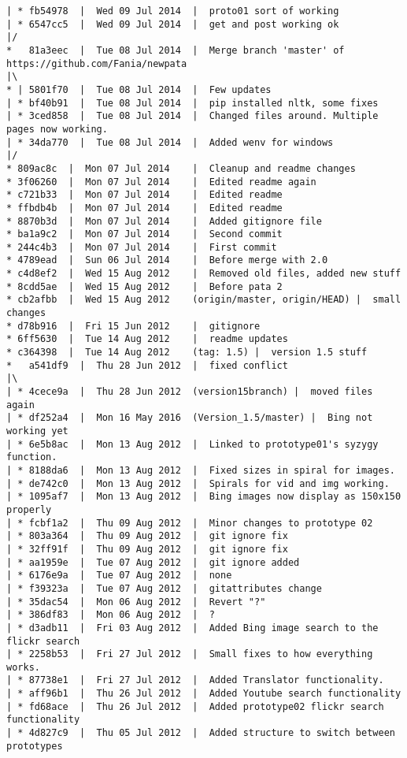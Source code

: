 \begin{verbatim}
| * fb54978  |  Wed 09 Jul 2014	 |  proto01 sort of working
| * 6547cc5  |  Wed 09 Jul 2014	 |  get and post working ok
|/  
*   81a3eec  |  Tue 08 Jul 2014	 |  Merge branch 'master' of https://github.com/Fania/newpata
|\  
* | 5801f70  |  Tue 08 Jul 2014	 |  Few updates
| * bf40b91  |  Tue 08 Jul 2014	 |  pip installed nltk, some fixes
| * 3ced858  |  Tue 08 Jul 2014	 |  Changed files around. Multiple pages now working.
| * 34da770  |  Tue 08 Jul 2014	 |  Added wenv for windows
|/  
* 809ac8c  |  Mon 07 Jul 2014	 |  Cleanup and readme changes
* 3f06260  |  Mon 07 Jul 2014	 |  Edited readme again
* c721b33  |  Mon 07 Jul 2014	 |  Edited readme
* ffbdb4b  |  Mon 07 Jul 2014	 |  Edited readme
* 8870b3d  |  Mon 07 Jul 2014	 |  Added gitignore file
* ba1a9c2  |  Mon 07 Jul 2014	 |  Second commit
* 244c4b3  |  Mon 07 Jul 2014	 |  First commit
* 4789ead  |  Sun 06 Jul 2014	 |  Before merge with 2.0
* c4d8ef2  |  Wed 15 Aug 2012	 |  Removed old files, added new stuff
* 8cdd5ae  |  Wed 15 Aug 2012	 |  Before pata 2
* cb2afbb  |  Wed 15 Aug 2012	 (origin/master, origin/HEAD) |  small changes
* d78b916  |  Fri 15 Jun 2012	 |  gitignore
* 6ff5630  |  Tue 14 Aug 2012	 |  readme updates
* c364398  |  Tue 14 Aug 2012	 (tag: 1.5) |  version 1.5 stuff
*   a541df9  |  Thu 28 Jun 2012	 |  fixed conflict
|\  
| * 4cece9a  |  Thu 28 Jun 2012	 (version15branch) |  moved files again
| * df252a4  |  Mon 16 May 2016	 (Version_1.5/master) |  Bing not working yet
| * 6e5b8ac  |  Mon 13 Aug 2012	 |  Linked to prototype01's syzygy function.
| * 8188da6  |  Mon 13 Aug 2012	 |  Fixed sizes in spiral for images.
| * de742c0  |  Mon 13 Aug 2012	 |  Spirals for vid and img working.
| * 1095af7  |  Mon 13 Aug 2012	 |  Bing images now display as 150x150 properly
| * fcbf1a2  |  Thu 09 Aug 2012	 |  Minor changes to prototype 02
| * 803a364  |  Thu 09 Aug 2012	 |  git ignore fix
| * 32ff91f  |  Thu 09 Aug 2012	 |  git ignore fix
| * aa1959e  |  Tue 07 Aug 2012	 |  git ignore added
| * 6176e9a  |  Tue 07 Aug 2012	 |  none
| * f39323a  |  Tue 07 Aug 2012	 |  gitattributes change
| * 35dac54  |  Mon 06 Aug 2012	 |  Revert "?"
| * 386df83  |  Mon 06 Aug 2012	 |  ?
| * d3adb11  |  Fri 03 Aug 2012	 |  Added Bing image search to the flickr search
| * 2258b53  |  Fri 27 Jul 2012	 |  Small fixes to how everything works.
| * 87738e1  |  Fri 27 Jul 2012	 |  Added Translator functionality.
| * aff96b1  |  Thu 26 Jul 2012	 |  Added Youtube search functionality
| * fd68ace  |  Thu 26 Jul 2012	 |  Added prototype02 flickr search functionality
| * 4d827c9  |  Thu 05 Jul 2012	 |  Added structure to switch between prototypes

\end{verbatim}
